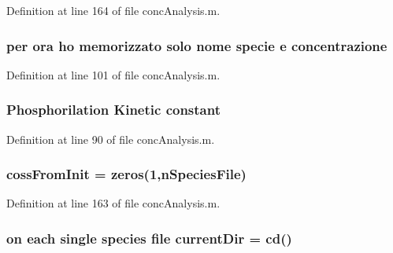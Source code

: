 Definition at line 164 of file conc\+Analysis.\+m.

\hypertarget{a00025_a5acf1fa9f8d0cb2ab8b1505ffd4dce5b}{
\subsubsection[{concentrazione}]{ per ora ho memorizzato solo nome specie e concentrazione}}\label{a00025_a5acf1fa9f8d0cb2ab8b1505ffd4dce5b}


Definition at line 101 of file conc\+Analysis.\+m.

\hypertarget{a00025_a163bb0e728c363ddfbd84725ee4bcbf1}{
\subsubsection[{constant}]{\setlength{\rightskip}{0pt plus 5cm}Phosphorilation Kinetic constant}}\label{a00025_a163bb0e728c363ddfbd84725ee4bcbf1}


Definition at line 90 of file conc\+Analysis.\+m.

\hypertarget{a00025_a547b10724f74451f717078739944cc74}{
\subsubsection[{coss\+From\+Init}]{\setlength{\rightskip}{0pt plus 5cm}coss\+From\+Init = zeros(1,n\+Species\+File)}}\label{a00025_a547b10724f74451f717078739944cc74}


Definition at line 163 of file conc\+Analysis.\+m.

\hypertarget{a00025_afb60cd67e28ca8c9fa44e4f5452589b9}{
\subsubsection[{current\+Dir}]{\setlength{\rightskip}{0pt plus 5cm}on each single {\bf species} {\bf file} current\+Dir = {\bf cd}()}}\label{a00025_afb60cd67e28ca8c9fa44e4f5452589b9}


